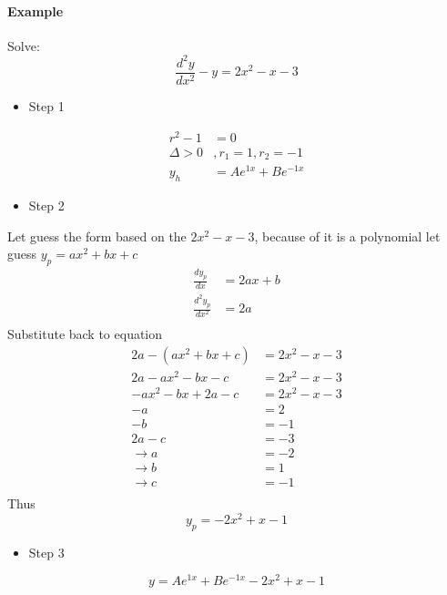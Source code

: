 \paragraph{Example} Solve:
\[
\frac{d^2y}{dx^2} - y= 2x^2 - x - 3
\]
\begin{itemize}
	\item Step 1
\end{itemize}
\[
\begin{split}
	r^2 - 1 &= 0 \\
	\Delta > 0 &, r_1=1,r_2=-1 \\
	y_h &= Ae^{1x} + Be^{-1x}
\end{split}
\]
\begin{itemize}
	\item Step 2
\end{itemize}
Let guess the form based on the \(2x^2 - x - 3\), because of it is a polynomial let guess \(y_p = ax^2 + bx + c\)
\[
\begin{split}
	\frac{dy_p}{dx} &= 2ax+b \\
	\frac{d^2y_p}{dx^2} &= 2a \\
\end{split}
\]
Substitute back to equation
\[
\begin{split}
	2a - (ax^2 + bx + c) &= 2x^2 - x - 3 \\
	2a - ax^2 - bx - c &= 2x^2 - x - 3 \\
	-ax^2-bx+2a-c &=2x^2 - x - 3 \\
	-a &= 2 \\
	-b &= -1 \\
	2a-c &= -3 \\
	\rightarrow a &= -2 \\
	\rightarrow b &= 1 \\
	\rightarrow c &= -1 \\
\end{split}
\]
Thus
\[
y_p = -2x^2 + x - 1
\]
\begin{itemize}
	\item Step 3
\end{itemize}
\[
y =  Ae^{1x} + Be^{-1x} -2x^2 + x - 1
\]